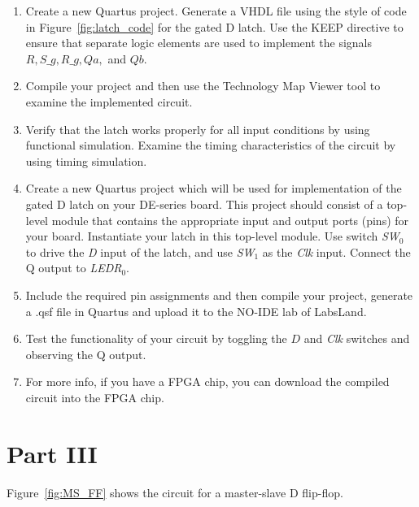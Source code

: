 \documentclass[epsfig,10pt,fullpage]{article}
\begin{document}
\begin{enumerate}
\item Create a new Quartus project. Generate a VHDL file using the style of code 
in Figure~\ref{fig:latch_code} for the gated D latch. Use the KEEP directive to ensure
that separate logic elements are used to implement the signals $R, S\_g, R\_g, Qa,$ and
$Qb$.
\item Compile your project and then use the 
Technology Map Viewer tool to examine the implemented circuit.
\item Verify that the latch works properly for all input conditions by using functional 
simulation. Examine the timing characteristics of the circuit by using timing simulation.
\item Create a new Quartus project which will be used for implementation of the gated D
latch on your DE-series board. This project should consist of a top-level module that 
contains the appropriate input and output ports (pins) for your board. Instantiate your
latch in this top-level module. Use switch {\it SW}$_0$ to drive the {\it D} input of the latch,
and use {\it SW}$_1$ as the {\it Clk} input. Connect the Q output to {\it LEDR}$_{0}$.
\item
Include the required pin assignments and then compile your project, generate a .qsf file in Quartus and upload it to the NO-IDE lab of LabsLand.
\item
Test the functionality of your circuit by toggling the $D$ and {\it Clk} switches and observing 
the Q output.
\item For more info, if you have a FPGA chip, you can download the compiled circuit into the FPGA chip.
\end{enumerate}

\section*{Part III}
Figure~\ref{fig:MS_FF} shows the circuit for a master-slave D flip-flop.
\end{document}
